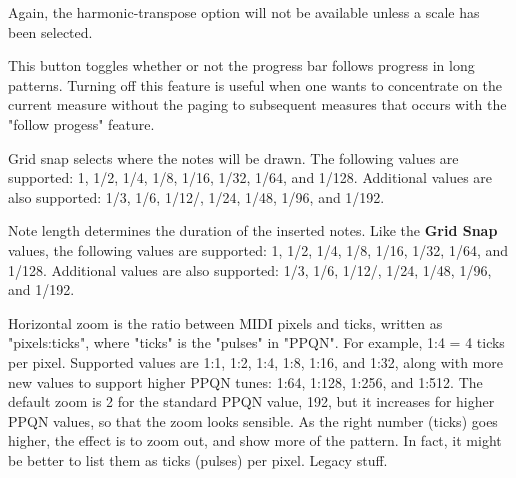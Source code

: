    Again, the harmonic-transpose option will not be available unless a scale
   has been selected.

   This button toggles whether or not the progress bar follows
   progress in long patterns.  Turning off this feature is useful when
   one wants to concentrate on the current measure without the paging to
   subsequent measures that occurs with the "follow progess" feature.

   Grid snap selects where the notes will be drawn.
   The following values are supported:
   1, 1/2, 1/4, 1/8, 1/16, 1/32, 1/64, and 1/128.
   Additional values are also supported:
   1/3, 1/6, 1/12/, 1/24, 1/48, 1/96, and 1/192.

   Note length determines the duration of the inserted notes.
   Like the \textbf{Grid Snap} values,
   the following values are supported:
   1, 1/2, 1/4, 1/8, 1/16, 1/32, 1/64, and 1/128.
   Additional values are also supported:
   1/3, 1/6, 1/12/, 1/24, 1/48, 1/96, and 1/192.

   Horizontal zoom is the ratio between MIDI pixels and ticks, written as
   "pixels:ticks", where "ticks" is the "pulses" in "PPQN".
   For example, 1:4 = 4 ticks per pixel.
   Supported values are 1:1, 1:2, 1:4, 1:8, 1:16, and 1:32, along with
   more new values to support higher PPQN tunes: 1:64, 1:128, 1:256, and
   1:512.
   The default zoom is 2 for the standard PPQN value, 192, but it
   increases for higher PPQN values, so that the zoom looks sensible.
   As the right number (ticks) goes higher,
   the effect is to zoom out, and show more of the pattern.
   In fact, it might be better to list them as ticks (pulses) per pixel.
   Legacy stuff.



